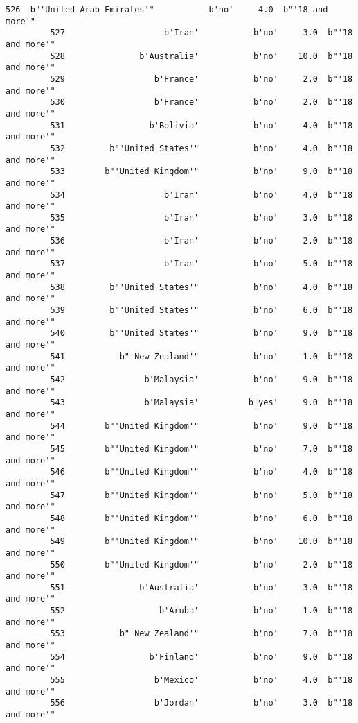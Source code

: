 \documentclass[11pt]{article}
\begin{document}
\begin{Verbatim}[commandchars=\\\{\}]
         526  b"'United Arab Emirates'"           b'no'     4.0  b"'18 and more'"   
         527                    b'Iran'           b'no'     3.0  b"'18 and more'"   
         528               b'Australia'           b'no'    10.0  b"'18 and more'"   
         529                  b'France'           b'no'     2.0  b"'18 and more'"   
         530                  b'France'           b'no'     2.0  b"'18 and more'"   
         531                 b'Bolivia'           b'no'     4.0  b"'18 and more'"   
         532         b"'United States'"           b'no'     4.0  b"'18 and more'"   
         533        b"'United Kingdom'"           b'no'     9.0  b"'18 and more'"   
         534                    b'Iran'           b'no'     4.0  b"'18 and more'"   
         535                    b'Iran'           b'no'     3.0  b"'18 and more'"   
         536                    b'Iran'           b'no'     2.0  b"'18 and more'"   
         537                    b'Iran'           b'no'     5.0  b"'18 and more'"   
         538         b"'United States'"           b'no'     4.0  b"'18 and more'"   
         539         b"'United States'"           b'no'     6.0  b"'18 and more'"   
         540         b"'United States'"           b'no'     9.0  b"'18 and more'"   
         541           b"'New Zealand'"           b'no'     1.0  b"'18 and more'"   
         542                b'Malaysia'           b'no'     9.0  b"'18 and more'"   
         543                b'Malaysia'          b'yes'     9.0  b"'18 and more'"   
         544        b"'United Kingdom'"           b'no'     9.0  b"'18 and more'"   
         545        b"'United Kingdom'"           b'no'     7.0  b"'18 and more'"   
         546        b"'United Kingdom'"           b'no'     4.0  b"'18 and more'"   
         547        b"'United Kingdom'"           b'no'     5.0  b"'18 and more'"   
         548        b"'United Kingdom'"           b'no'     6.0  b"'18 and more'"   
         549        b"'United Kingdom'"           b'no'    10.0  b"'18 and more'"   
         550        b"'United Kingdom'"           b'no'     2.0  b"'18 and more'"   
         551               b'Australia'           b'no'     3.0  b"'18 and more'"   
         552                   b'Aruba'           b'no'     1.0  b"'18 and more'"   
         553           b"'New Zealand'"           b'no'     7.0  b"'18 and more'"   
         554                 b'Finland'           b'no'     9.0  b"'18 and more'"   
         555                  b'Mexico'           b'no'     4.0  b"'18 and more'"   
         556                  b'Jordan'           b'no'     3.0  b"'18 and more'"   

\end{Verbatim}
\end{document}
